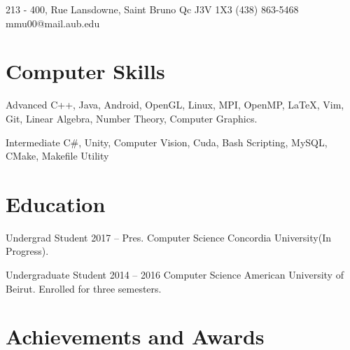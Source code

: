 \documentclass{tccv}
\begin{document}
\personal
    {213 - 400,  Rue Lansdowne, Saint Bruno \hspace{1cm} Qc J3V 1X3}
    {(438) 863-5468}
    {mmu00@mail.aub.edu}
    
\section{Computer Skills}

\begin{factlist}

\item{Advanced}
     {C++, Java, Android, OpenGL, Linux, MPI, OpenMP, \LaTeX, Vim, Git, Linear Algebra, Number Theory, Computer Graphics.}


\item{Intermediate}
     {C\#, Unity, Computer Vision,  Cuda, Bash Scripting, MySQL, CMake, Makefile Utility}

\end{factlist}    
    

\section{Education}

\begin{yearlist}

\item[Undergrad Student]{2017 -- Pres.}
     {Computer Science } 
     {Concordia University(In Progress).}

\item[Undergraduate Student]{2014 -- 2016}
     {Computer Science} 
     {American University of Beirut. Enrolled for three semesters.}



\end{yearlist}



\section{Achievements and Awards}
\end{document}
